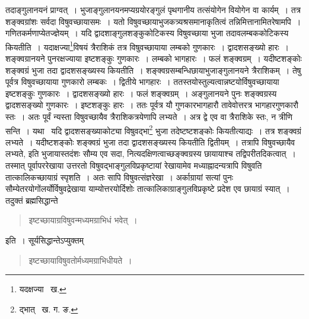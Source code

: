 \documentclass[11pt, openany]{book}
\begin{document}
\noindent तदाङ्गुलानयनं प्राग्वत्~। भुजाङ्गुलानयनमप्यग्रयोरङ्गुलं पृथगानीय तत्संयोगेन वियोगेन वा कार्यम्~। तत्र शङ्क्वग्रांशः 
सर्वदा विषुवच्छायासमः~। यतो विषुवच्छायाभुजकत्र्यश्रसमानाकृतित्वं तन्निमित्तानामितरेषामपि~। गणितकर्मणाप्येतज्ज्ञेयम्~। यदि द्वादशाङ्गुलशङ्कुकोटिकस्य विषुवच्छाया भुजा तदावलम्बककोटिकस्य कियतीति~। यदाक्षज्या\renewcommand{\thefootnote}{१}\footnote{यदक्षज्या \textendash\ ख.}विषयं त्रैराशिकं तत्र विषुवच्छायाया लम्बको गुणकारः~। द्वादशसङ्ख्यो हारः~। शङ्क्वग्रानयने पुनरक्षज्याया इष्टशङ्कुः गुणकारः~। लम्बको भागहारः~। फलं शङ्क्वग्रम्~। यदीष्टशङ्कोः शङ्क्वग्रं भुजा तदा द्वादशसङ्ख्यस्य कियतीति~। शङ्क्वग्रसम्बन्धिछायाभुजाङ्गुलानयने त्रैराशिकम्~। तेषु पूर्वत्र विषुवच्छायाया गुणकारो लम्बकः~। द्वितीये भागहारः~। ततस्तयोस्तुल्यत्वान्नष्टयोर्विषुवच्छायाया इष्टशङ्कुः गुणकारः~। द्वादशसङ्ख्यो हारः~। फलं शङ्क्वग्रम्~। अङ्गुलानयने पुनः शङ्क्वग्रस्य द्वादशसङ्ख्यो गुणकारः~। इष्टशङ्कुः हारः~। ततः पूर्वत्र यौ गुणकारभागहारौ तावेवोत्तरत्र भागहारगुणकारौ स्तः~। अतः पूर्वं न्यस्ता विषुवच्छायैव त्रैराशिकत्रयेणापि लभ्यते~। अत्र द्वे एव वा त्रैराशिके स्तः, न त्रीणि सन्ति~। यथा \textendash\ यदि द्वादशसङ्ख्याकोट्या 
विषुवद्भा\renewcommand{\thefootnote}{२}\footnote{द्भात् \textendash\ ख. ग. ङ.} भुजा तदेष्टष्टशङ्कोः कियतीत्याद्यः~। तत्र शङ्क्वग्रं लभ्यते~। यदीष्टशङ्कोः शङ्क्वग्रं भुजा तदा द्वादशसङ्ख्यस्य कियतीति द्वितीयम्~। तत्रापि विषुवच्छायैव लभ्यते, इति भुजायास्तदंशः सौम्य एव सदा, नित्यदक्षिणत्वाच्छङ्क्वग्रस्य छायायाश्च तद्विपरीतदिकत्वात्~। तस्मात् पूर्वापररेखाया उत्तरतो विषुवद्भाङ्गुलविप्रकृष्टायां रेखायामेव मध्याह्नादन्यत्रापि विषुवति तात्कालिकच्छायाग्रं स्पृशति~। अतः सापि विषुवत्संज्ञरेखा~। अर्काग्रायां सत्यां पुनः सौम्येतरयोगोंलर्योर्विषुवद्रेखाया याम्योत्तरयोर्दिशोः तात्कालिकाग्राङ्गुलविप्रकृष्टे प्रदेश एव छायाग्रं स्यात्~। तदुक्तं ब्रह्मसिद्धान्ते\textendash  


\newpage

\begin{quote}
{\qt इष्टच्छायाग्रविषुवन्मध्यमग्राभिधं भवेत्~।}
\end{quote} 

इति~। सूर्यसिद्धान्तेऽप्युक्तम्\textendash 
 
\begin{quote}
{\qt इष्टच्छायाविषुवतोर्मध्यमग्राभिधीयते~।}
\end{quote} 
\end{document}
